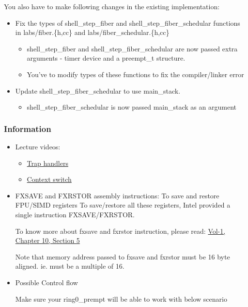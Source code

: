 \documentclass[]{book}
\begin{document}
You also have to make following changes in the existing implementation:

\begin{itemize}
\itemsep1pt\parskip0pt
\item
  Fix the types of shell\_step\_fiber and shell\_step\_fiber\_schedular
  functions in labs/fiber.\{h,cc\} and labs/fiber\_schedular.\{h,cc\}

  \begin{itemize}
  \itemsep1pt\parskip0pt
  \item
    shell\_step\_fiber and shell\_step\_fiber\_schedular are now passed
    extra arguments - timer device and a preempt\_t structure.
  \item
    You've to modify types of these functions to fix the compiler/linker
    error
  \end{itemize}
\item
  Update shell\_step\_fiber\_schedular to use main\_stack.

  \begin{itemize}
  \itemsep1pt\parskip0pt
  \item
    shell\_step\_fiber\_schedular is now passed main\_stack as an
    argument
  \end{itemize}
\end{itemize}

\subsubsection*{Information}\label{information-7}

\begin{itemize}
\item
  Lecture videos:

  \begin{itemize}
  \itemsep1pt\parskip0pt
  \item
    \href{}{Trap handlers}
  \item
    \href{}{Context switch}
  \end{itemize}
\item
  FXSAVE and FXRSTOR assembly instructions: To save and restore FPU/SIMD
  registers To save/restore all these registers, Intel provided a single
  instruction FXSAVE/FXRSTOR.

  To know more about fxsave and fxrstor instruction, please read:
  \href{http://www.cse.iitd.ac.in/~deepak/hohlabs/intel.pdf}{Vol-1,
  Chapter 10, Section 5}

  Note that memory address passed to fxsave and fxrstor must be 16 byte
  aligned. ie. must be a multiple of 16.
\item
  Possible Control flow

  Make sure your ring0\_prempt will be able to work with below scenario
\end{itemize}
\end{document}
